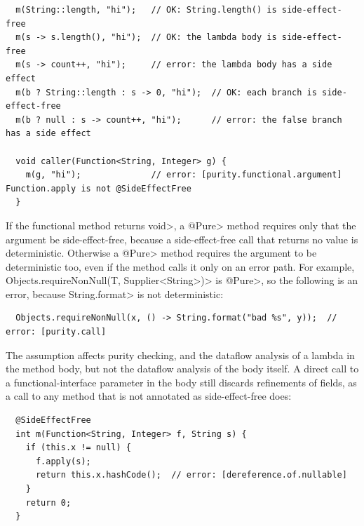 \begin{Verbatim}
  m(String::length, "hi");   // OK: String.length() is side-effect-free
  m(s -> s.length(), "hi");  // OK: the lambda body is side-effect-free
  m(s -> count++, "hi");     // error: the lambda body has a side effect
  m(b ? String::length : s -> 0, "hi");  // OK: each branch is side-effect-free
  m(b ? null : s -> count++, "hi");      // error: the false branch has a side effect

  void caller(Function<String, Integer> g) {
    m(g, "hi");              // error: [purity.functional.argument] Function.apply is not @SideEffectFree
  }
\end{Verbatim}

If the functional method returns \<void>, a \<@Pure> method requires only
that the argument be side-effect-free, because a side-effect-free call that
returns no value is deterministic.  Otherwise a \<@Pure> method requires the
argument to be deterministic too, even if the method calls it only on an
error path.  For example, \<Objects.requireNonNull(T, Supplier<String>)> is
\<@Pure>, so the following is an error, because \<String.format> is not
deterministic:

\begin{Verbatim}
  Objects.requireNonNull(x, () -> String.format("bad %s", y));  // error: [purity.call]
\end{Verbatim}

The assumption affects purity checking, and the dataflow analysis of a lambda
in the method body, but not the dataflow analysis of the body itself.  A
direct call to a functional-interface parameter in the body still discards
refinements of fields, as a call to any method that is not annotated as
side-effect-free does:

\begin{Verbatim}
  @SideEffectFree
  int m(Function<String, Integer> f, String s) {
    if (this.x != null) {
      f.apply(s);
      return this.x.hashCode();  // error: [dereference.of.nullable]
    }
    return 0;
  }
\end{Verbatim}

%
%


